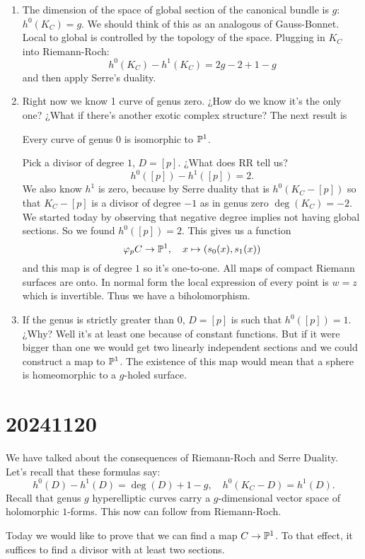 \documentclass[12pt]{memoir}
\begin{document}
\begin{enumerate}
    \item The dimension of the space of global section of the canonical bundle is $g$: $h^0(K_C)=g$. We should think of this as an analogous of Gauss-Bonnet. Local to global is controlled by the topology of the space. Plugging in $K_C$ into Riemann-Roch:
    $$h^0(K_C)-h^1(K_C)=2g-2+1-g$$
    and then apply Serre's duality.
    \item Right now we know 1 curve of genus zero. ¿How do we know it's the only one? ¿What if there's another exotic complex structure? The next result is 
    \begin{significant}
        Every curve of genus 0 is isomorphic to $\mathbb{P}^1$.
    \end{significant}
    Pick a divisor of degree $1$, $D=[p]$. ¿What does RR tell us?
    $$h^0([p])-h^1([p])=2.$$
    We also know $h^1$ is zero, because by Serre duality that is $h^0(K_C-[p])$ so that $K_C-[p]$ is a divisor of degree $-1$ as in genus zero $\deg(K_C)=-2$. We started today by observing that negative degree implies not having global sections. So we found $h^0([p])=2$. This gives us a function 
    $$\varphi_pC\to\mathbb{P}^1,\quad x\mapsto(s_0(x),s_1(x))$$
    and this map is of degree $1$ so it's one-to-one. All maps of compact Riemann surfaces are onto. In normal form the local expression of every point is $w=z$ which is invertible. Thus we have a biholomorphism.
    \item If the genus is strictly greater than $0$, $D=[p]$ is such that $h^0([p])=1$. ¿Why? Well it's at least one because of constant functions. But if it were bigger than one we would get two linearly independent sections and we could construct a map to $\mathbb{P}^1$. The existence of this map would mean that a sphere is homeomorphic to a $g$-holed surface.
\end{enumerate}

\section{20241120}

We have talked about the consequences of Riemann-Roch and Serre Duality. Let's recall that these formulas say: 
$$h^0(D)-h^1(D)=\deg(D)+1-g,\quad h^0(K_C-D)=h^1(D).$$
Recall that genus $g$ hyperelliptic curves carry a $g$-dimensional vector space of holomorphic $1$-forms. This now can follow from Riemann-Roch.\par
Today we would like to prove that we can find a map $C\to\mathbb{P}^1$. To that effect, it suffices to find a divisor with at least two sections.
\end{document}
